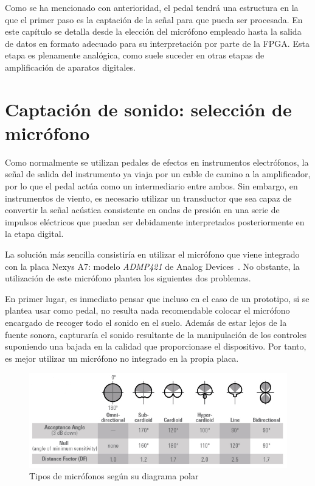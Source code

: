 Como se ha mencionado con anterioridad, el pedal tendrá una estructura en la que el primer paso es la captación de la señal para que pueda ser procesada. En este capítulo se detalla desde la elección del micrófono empleado hasta la salida de datos en formato adecuado para su interpretación por parte de la FPGA. Esta etapa es plenamente analógica, como suele suceder en otras etapas de amplificación de aparatos digitales.

\section{Captación de sonido: selección de micrófono}

Como normalmente se utilizan pedales de efectos en instrumentos electrófonos, la señal de salida del instrumento ya viaja por un cable de camino a la amplificador, por lo que el pedal actúa como un intermediario entre ambos. Sin embargo, en instrumentos de viento, es necesario utilizar un transductor que sea capaz de convertir la señal acústica consistente en ondas de presión en una serie de impulsos eléctricos que puedan ser debidamente interpretados posteriormente en la etapa digital.

La solución más sencilla consistiría en utilizar el micrófono que viene integrado con la placa Nexys A7: modelo \emph{ADMP421} de Analog Devices~\cite{Nexys}. No obstante, la utilización de este micrófono plantea los siguientes dos problemas.

En primer lugar, es inmediato pensar que incluso en el caso de un prototipo, si se plantea usar como pedal, no resulta nada recomendable colocar el micrófono encargado de recoger todo el sonido en el suelo. Además de estar lejos de la fuente sonora, capturaría el sonido resultante de la manipulación de los controles suponiendo una bajada en la calidad que proporcionase el dispositivo. Por tanto, es mejor utilizar un micrófono no integrado en la propia placa.

\begin{figure}
\begin{center}
\includegraphics[width=15cm]{img/micros.png}
\caption{\label{fig:polar_dig}Tipos de micrófonos según su diagrama polar~\cite{Mic}}
\end{center}
\end{figure}

